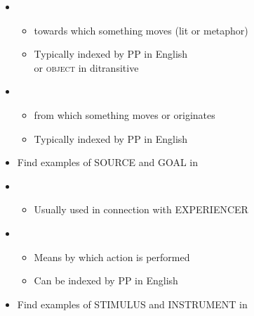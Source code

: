 \documentclass[a4paper,landscape,headrule,footrule,xetex]{foils}
\begin{document}
\begin{itemize}
\item  {}
  \begin{itemize}
  \item  towards which something moves (lit or metaphor)
 \item  Typically indexed by  PP in English 
   \\ or \textsc{object} in ditransitive
  \end{itemize}
  \begin{exe}
  \ex{}
  \ex{}
  \end{exe}
\item  {}
 \begin{itemize}
 \item  from which something moves or originates
 \item  Typically indexed by  PP in English
 \end{itemize}
  \begin{exe}
 \ex{}  
\end{exe}
\item Find  examples of SOURCE and GOAL in \Story{}\task
\newpage
\item  {}
  \begin{itemize}
  \item  Usually used in connection with EXPERIENCER
  \end{itemize}
  \begin{exe}
  \ex{}
  \ex{}
\end{exe}
\item  {}
  \begin{itemize}
  \item  Means by which action is performed
  \item  Can be indexed by  PP in English
  \end{itemize}
  \begin{exe}
    \ex{}
  \end{exe}
\item Find  examples of STIMULUS and INSTRUMENT in \Story{}\task
\end{itemize}


\end{document}
